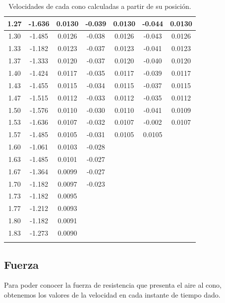 \begin{longtable}{|c|c|c|c|c|c|c|}
    \hline 1.27 & -1.636 & 0.0130 & -0.039 & 0.0130 & -0.044 & 0.0130 \\
    \hline 1.30 & -1.485 & 0.0126 & -0.038 & 0.0126 & -0.043 & 0.0126 \\
    \hline 1.33 & -1.182 & 0.0123 & -0.037 & 0.0123 & -0.041 & 0.0123 \\
    \hline 1.37 & -1.333 & 0.0120 & -0.037 & 0.0120 & -0.040 & 0.0120 \\
    \hline 1.40 & -1.424 & 0.0117 & -0.035 & 0.0117 & -0.039 & 0.0117 \\
    \hline 1.43 & -1.455 & 0.0115 & -0.034 & 0.0115 & -0.037 & 0.0115 \\
    \hline 1.47 & -1.515 & 0.0112 & -0.033 & 0.0112 & -0.035 & 0.0112 \\
    \hline 1.50 & -1.576 & 0.0110 & -0.030 & 0.0110 & -0.041 & 0.0109 \\
    \hline 1.53 & -1.636 & 0.0107 & -0.032 & 0.0107 & -0.002 & 0.0107 \\
    \hline 1.57 & -1.485 & 0.0105 & -0.031 & 0.0105 & 0.0105 & \\
    \hline 1.60 & -1.061 & 0.0103 & -0.028 & & & \\
    \hline 1.63 & -1.485 & 0.0101 & -0.027 & & & \\
    \hline 1.67 & -1.364 & 0.0099 & -0.027 & & & \\
    \hline 1.70 & -1.182 & 0.0097 & -0.023 & & & \\
    \hline 1.73 & -1.182 & 0.0095 &        &        &        & \\
    \hline 1.77 & -1.212 & 0.0093 &        &        &        & \\
    \hline 1.80 & -1.182 & 0.0091 &        &        &        & \\
    \hline 1.83 & -1.273 & 0.0090 &        &        &        & \\
    \hline
    \caption{Velocidades de cada cono calculadas a partir
    de su posición.}
    \label{tab:Vel_Pos}
\end{longtable}
\subsection{Fuerza}

Para poder conocer la fuerza de resistencia que presenta el
aire al cono, obtenemos los valores de la velocidad en cada instante
de tiempo dado.


